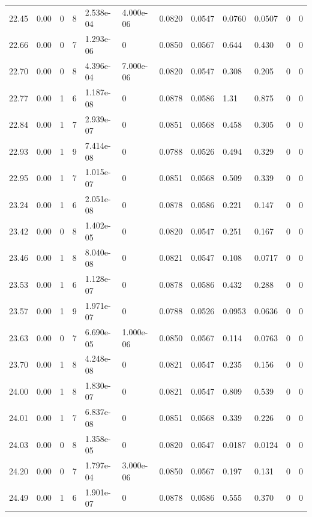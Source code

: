 \documentclass[preview]{standalone}
\begin{document}
{{{{{{\begin{tabular}{L{1.2cm}C{1.2cm} C{0.3cm}C{0.5cm} C{1.4cm}C{1.4cm} C{1.4cm}C{1.4cm} C{1.6cm}C{1.6cm} C{1.6cm}C{1.6cm}}
  22.45  &  0.00  & 0     &  8 &  2.538e-04  & 4.000e-06  &  0.0820&   0.0547& 0.0760 & 0.0507   &  0 & 0  \\ 
  22.66  &  0.00  & 0     &  7 &  1.293e-06  & 0  &  0.0850&   0.0567& 0.644 & 0.430   &  0 & 0  \\ 
  22.70  &  0.00  & 0     &  8 &  4.396e-04  & 7.000e-06  &  0.0820&   0.0547& 0.308 & 0.205   &  0 & 0  \\ 
  22.77  &  0.00  & 1     &  6 &  1.187e-08  & 0  &  0.0878&   0.0586& 1.31 & 0.875   &  0 & 0  \\ 
  22.84  &  0.00  & 1     &  7 &  2.939e-07  & 0  &  0.0851&   0.0568& 0.458 & 0.305   &  0 & 0  \\ 
  22.93  &  0.00  & 1     &  9 &  7.414e-08  & 0  &  0.0788&   0.0526& 0.494 & 0.329   &  0 & 0  \\ 
  22.95  &  0.00  & 1     &  7 &  1.015e-07  & 0  &  0.0851&   0.0568& 0.509 & 0.339   &  0 & 0  \\ 
  23.24  &  0.00  & 1     &  6 &  2.051e-08  & 0  &  0.0878&   0.0586& 0.221 & 0.147   &  0 & 0  \\ 
  23.42  &  0.00  & 0     &  8 &  1.402e-05  & 0  &  0.0820&   0.0547& 0.251 & 0.167   &  0 & 0  \\ 
  23.46  &  0.00  & 1     &  8 &  8.040e-08  & 0  &  0.0821&   0.0547& 0.108 & 0.0717   &  0 & 0  \\ 
  23.53  &  0.00  & 1     &  6 &  1.128e-07  & 0  &  0.0878&   0.0586& 0.432 & 0.288   &  0 & 0  \\ 
  23.57  &  0.00  & 1     &  9 &  1.971e-07  & 0  &  0.0788&   0.0526& 0.0953 & 0.0636   &  0 & 0  \\ 
  23.63  &  0.00  & 0     &  7 &  6.690e-05  & 1.000e-06  &  0.0850&   0.0567& 0.114 & 0.0763   &  0 & 0  \\ 
  23.70  &  0.00  & 1     &  8 &  4.248e-08  & 0  &  0.0821&   0.0547& 0.235 & 0.156   &  0 & 0  \\ 
  24.00  &  0.00  & 1     &  8 &  1.830e-07  & 0  &  0.0821&   0.0547& 0.809 & 0.539   &  0 & 0  \\ 
  24.01  &  0.00  & 1     &  7 &  6.837e-08  & 0  &  0.0851&   0.0568& 0.339 & 0.226   &  0 & 0  \\ 
  24.03  &  0.00  & 0     &  8 &  1.358e-05  & 0  &  0.0820&   0.0547& 0.0187 & 0.0124   &  0 & 0  \\ 
  24.20  &  0.00  & 0     &  7 &  1.797e-04  & 3.000e-06  &  0.0850&   0.0567& 0.197 & 0.131   &  0 & 0  \\ 
  24.49  &  0.00  & 1     &  6 &  1.901e-07  & 0  &  0.0878&   0.0586& 0.555 & 0.370   &  0 & 0  \\ 

\end{tabular}}}}}}}
\end{document}

